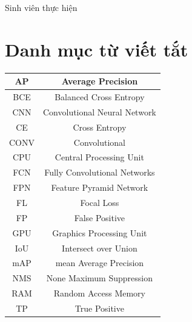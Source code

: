 \documentclass[a4paper, 12pt]{report}
\begin{document}
\begin{flushright}
Sinh viên thực hiện
\end{flushright}
%
%

\tableofcontents{}

\listoffigures

\chapter*{Danh mục từ viết tắt}
\begin{center}
\begin{tabular}{ |c|c| } 
 \hline
   AP &  Average Precision \\ 
  \hline
  BCE & Balanced Cross Entropy \\
\hline
 CNN & Convolutional Neural Network \\
 \hline
  CE & Cross Entropy \\
 \hline
 CONV & Convolutional \\
 \hline
  CPU & Central Processing Unit \\
 \hline
   FCN & Fully Convolutional Networks \\ 
 \hline
  FPN & Feature Pyramid Network \\ 
 \hline
   FL & Focal Loss \\ 
 \hline
   FP & False Positive \\  
 \hline
  GPU & Graphics Processing Unit \\
 \hline
 IoU & Intersect over Union \\ 
 \hline
 mAP & mean Average Precision \\ 
 \hline
  NMS & None Maximum Suppression \\ 
 \hline
RAM & Random Access Memory \\
\hline
 TP & True Positive \\ 
\hline
\end{tabular}
\end{center}
\end{document}
